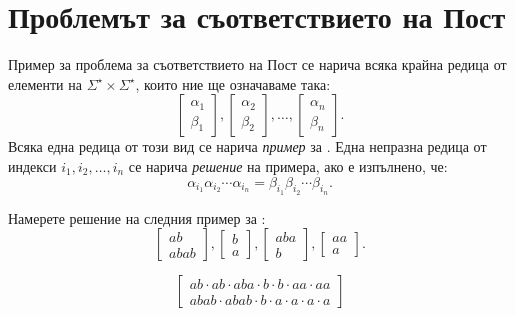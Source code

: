 \section{Проблемът за съответствието на Пост}\label{sect:turing:pcp}


Пример за проблема за съответствието на Пост се нарича всяка крайна редица от елементи на $\Sigma^\star \times \Sigma^\star$,
които ние ще означаваме така:
\[\begin{bmatrix} \alpha_1\\ \beta_1\end{bmatrix},\begin{bmatrix} \alpha_2\\ \beta_2\end{bmatrix},\dots,\begin{bmatrix} \alpha_n\\ \beta_n\end{bmatrix}.\]
Всяка една редица от този вид се нарича {\em пример} за \PCP.
Една непразна редица от индекси $i_1,i_2,\dots,i_n$ се нарича {\em решение} на \PCP примера, ако е изпълнено, че:
\[\alpha_{i_1}\alpha_{i_2}\cdots\alpha_{i_n} = \beta_{i_1}\beta_{i_2}\cdots\beta_{i_n}.\]

\begin{problem}
  Намерете решение на следния пример за \PCP:
  \[\begin{bmatrix}ab\\ abab\end{bmatrix},\begin{bmatrix} b\\ a\end{bmatrix},\begin{bmatrix} aba\\ b\end{bmatrix},\begin{bmatrix} aa\\ a\end{bmatrix}.\]
\end{problem}
\begin{solution}
  \[\begin{bmatrix}ab\cdot ab \cdot aba \cdot b \cdot b \cdot aa \cdot aa\\abab \cdot abab \cdot b \cdot a \cdot a \cdot a \cdot a\end{bmatrix}\]
\end{solution}


